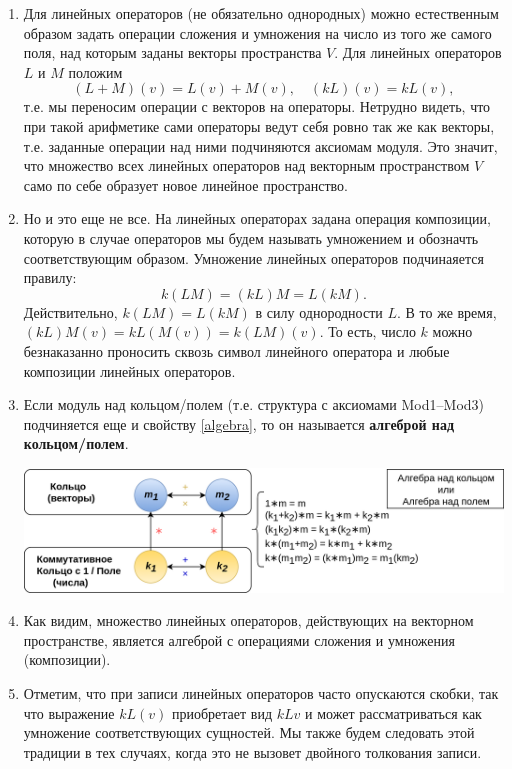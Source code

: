 \begin{enumerate}
\item Для линейных операторов (не обязательно однородных) можно естественным образом задать операции сложения и умножения на число из того же самого поля, над которым заданы векторы пространства $V$. Для линейных операторов $L$ и $M$ положим
$$
(L+M)(v) = L(v) + M(v),\quad (kL)(v) = kL(v),
$$
т.е. мы переносим операции с векторов на операторы. Нетрудно видеть, что при такой арифметике сами операторы ведут себя ровно так же как векторы, т.е. заданные операции над ними подчиняются аксиомам модуля. Это значит, что множество всех линейных операторов над векторным пространством $V$ само по себе образует новое линейное пространство.
\item Но и это еще не все. На линейных операторах задана операция композиции, которую в случае операторов мы будем называть умножением и обозначть соответствующим образом. Умножение линейных операторов подчинаяется правилу:
\begin{equation}\label{algebra}
k(LM)=(kL)M=L(kM).
\end{equation}
Действительно, $k(LM)=L(kM)$ в силу однородности $L$. В то же время, $(kL)M(v)=kL(M(v))=k(LM)(v)$. То есть, число $k$ можно безнаказанно проносить сквозь символ линейного оператора и любые композиции линейных операторов.

\item Если модуль над кольцом/полем (т.е. структура с аксиомами Mod1--Mod3) подчиняется еще и свойству \eqref{algebra}, то он называется \textbf{алгеброй над кольцом/полем}.
\begin{center}
\includegraphics[scale=0.3]{AlgebraOverRing.png}
\end{center}
\item Как видим, множество линейных операторов, действующих на векторном пространстве, является алгеброй с операциями сложения и умножения (композиции).
\item Отметим, что при записи линейных операторов часто опускаются скобки, так что выражение $kL(v)$ приобретает вид $kLv$ и может рассматриваться как умножение соответствующих сущностей. Мы также будем следовать этой традиции в тех случаях, когда это не вызовет двойного толкования записи.




\end{enumerate}
